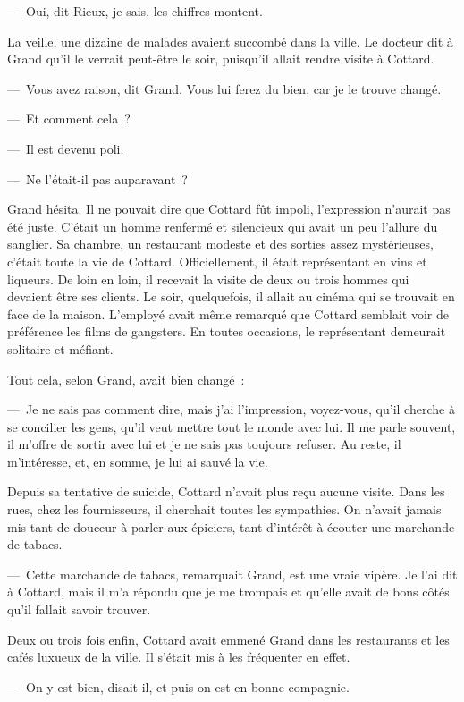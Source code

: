 \documentclass[french,twoside]{book} %
\begin{document}
— Oui, dit Rieux, je sais, les chiffres montent.\par
La veille, une dizaine de malades avaient succombé dans la ville. Le docteur dit à Grand qu’il le verrait peut-être le soir, puisqu’il allait rendre visite à Cottard.\par
— Vous avez raison, dit Grand. Vous lui ferez du bien, car je le trouve changé.\par
— Et comment cela ?\par
— Il est devenu poli.\par
— Ne l’était-il pas auparavant ?\par
Grand hésita. Il ne pouvait dire que Cottard fût impoli, l’expression n’aurait pas été juste. C’était un homme renfermé et silencieux qui avait un peu l’allure du sanglier. Sa chambre, un restaurant modeste et des sorties assez mystérieuses, c’était toute la vie de Cottard. Officiellement, il était représentant en vins et liqueurs. De loin en loin, il recevait la visite de deux ou trois hommes qui devaient être ses clients. Le soir, quelquefois, il allait au cinéma qui se trouvait en face de la maison. L’employé avait même remarqué que Cottard semblait voir de préférence les films de gangsters. En toutes occasions, le représentant demeurait solitaire et méfiant.\par
Tout cela, selon Grand, avait bien changé :\par
— Je ne sais pas comment dire, mais j’ai l’impression, voyez-vous, qu’il cherche à se concilier les gens, qu’il veut mettre tout le monde avec lui. Il me parle souvent, il m’offre de sortir avec lui et je ne sais pas toujours refuser. Au reste, il m’intéresse, et, en somme, je lui ai sauvé la vie.\par
Depuis sa tentative de suicide, Cottard n’avait plus reçu aucune visite. Dans les rues, chez les fournisseurs, il cherchait toutes les sympathies. On n’avait jamais mis tant de douceur à parler aux épiciers, tant d’intérêt à écouter une marchande de tabacs.\par
— Cette marchande de tabacs, remarquait Grand, est une vraie vipère. Je l’ai dit à Cottard, mais il m’a répondu que je me trompais et qu’elle avait de bons côtés qu’il fallait savoir trouver.\par
Deux ou trois fois enfin, Cottard avait emmené Grand dans les restaurants et les cafés luxueux de la ville. Il s’était mis à les fréquenter en effet.\par
— On y est bien, disait-il, et puis on est en bonne compagnie.\par
\end{document}
